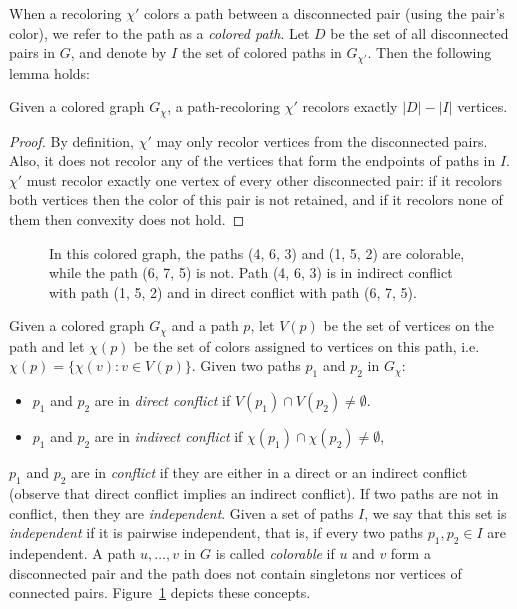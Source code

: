 When a recoloring $\chi'$ colors a path between a disconnected pair (using the pair's color), 
we refer to the path as a \emph{colored path}.
%
Let $D$ be the set of all disconnected pairs in $G$, 
and denote by $I$ the set of colored paths in $G_{\chi'}$. 
Then the following lemma holds:

\begin{lemma}
\label{lm:cost}
Given a colored graph $G_\chi$, 
a path-recoloring $\chi'$ recolors exactly $|D| - |I|$ vertices.
\end{lemma}

\begin{proof}
By definition,
$\chi'$ may only recolor vertices from the disconnected pairs.
Also, it does not recolor any of the vertices that form the endpoints of paths in $I$.
%
$\chi'$ must recolor exactly one vertex of every other disconnected pair:
if it recolors both vertices then the color of this pair is not retained,
and if it recolors none of them then convexity does not hold.
\end{proof}

\begin{figure}
\centering
{}
\caption[Convex Recoloring - Terminology]{
\label{fig:paths}
In this colored graph, the paths (4, 6, 3) and (1, 5, 2) are colorable, while
the path (6, 7, 5) is not.
Path (4, 6, 3) is in indirect conflict with path (1, 5, 2) and in direct
conflict with path (6, 7, 5).
}
\end{figure}
Given a colored graph $G_\chi$ and a path $p$, 
let $V(p)$ be the set of vertices on the path and let $\chi(p)$ 
be the set of colors assigned to vertices on this path, 
i.e. $\chi(p) = {\{\chi(v) : v \in V(p)\}}$.
%
Given two paths $p_1$ and $p_2$ in $G_\chi$:
\begin{itemize}
\item 
$p_1$ and $p_2$ are in \emph{direct conflict} if $V(p_1) \cap V(p_2) \neq \emptyset$.

\item 
$p_1$ and $p_2$ are in \emph{indirect conflict} if $\chi(p_1) \cap \chi(p_2) \neq \emptyset$,
\end{itemize}
%
$p_1$ and $p_2$ are in \emph{conflict} if they are either in a direct
or an indirect conflict 
(observe that direct conflict implies an indirect conflict).
%
If two paths are not in conflict, 
then they are \emph{independent}.
%
Given a set of paths $I$, 
we say that this set is \emph{independent}
if it is pairwise independent, 
that is, 
if every two paths $p_1, p_2 \in I$ are independent.
%
A path $u, \dots, v$ in $G$ is called \emph{colorable} if $u$ and $v$
form a disconnected pair and the path does not contain singletons nor
vertices of connected pairs.
%
Figure~\ref{fig:paths} depicts these concepts.

